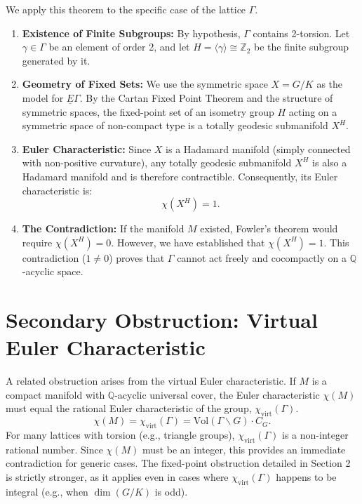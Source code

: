 \documentclass[11pt]{article}
\theoremstyle{plain}
\theoremstyle{definition}
\begin{document}
We apply this theorem to the specific case of the lattice $\Gamma$.

\begin{enumerate}
    \item \textbf{Existence of Finite Subgroups:} By hypothesis, $\Gamma$ contains 2-torsion. Let $\gamma \in \Gamma$ be an element of order 2, and let $H = \langle \gamma \rangle \cong \mathbb{Z}_2$ be the finite subgroup generated by it.

    \item \textbf{Geometry of Fixed Sets:} We use the symmetric space $X = G/K$ as the model for $\underline{E}\Gamma$. By the Cartan Fixed Point Theorem and the structure of symmetric spaces, the fixed-point set of an isometry group $H$ acting on a symmetric space of non-compact type is a totally geodesic submanifold $X^H$.
    
    \item \textbf{Euler Characteristic:} Since $X$ is a Hadamard manifold (simply connected with non-positive curvature), any totally geodesic submanifold $X^H$ is also a Hadamard manifold and is therefore contractible. Consequently, its Euler characteristic is:
    \[
    \chi(X^H) = 1.
    \]

    \item \textbf{The Contradiction:} If the manifold $M$ existed, Fowler's theorem would require $\chi(X^H) = 0$. However, we have established that $\chi(X^H) = 1$. This contradiction ($1 \neq 0$) proves that $\Gamma$ cannot act freely and cocompactly on a $\mathbb{Q}$-acyclic space.
\end{enumerate}

\section{Secondary Obstruction: Virtual Euler Characteristic}

A related obstruction arises from the virtual Euler characteristic. If $M$ is a compact manifold with $\mathbb{Q}$-acyclic universal cover, the Euler characteristic $\chi(M)$ must equal the rational Euler characteristic of the group, $\chi_{\text{virt}}(\Gamma)$.
\[
\chi(M) = \chi_{\text{virt}}(\Gamma) = \text{Vol}(\Gamma \backslash G) \cdot C_G.
\]
For many lattices with torsion (e.g., triangle groups), $\chi_{\text{virt}}(\Gamma)$ is a non-integer rational number. Since $\chi(M)$ must be an integer, this provides an immediate contradiction for generic cases. The fixed-point obstruction detailed in Section 2 is strictly stronger, as it applies even in cases where $\chi_{\text{virt}}(\Gamma)$ happens to be integral (e.g., when $\dim(G/K)$ is odd).
\end{document}
